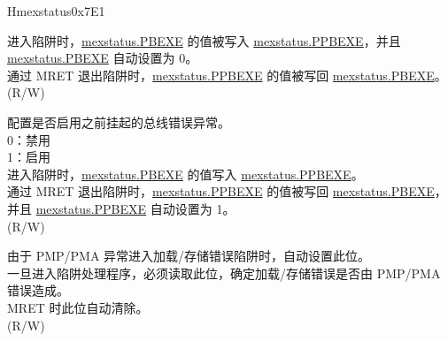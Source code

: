 \begin{register}{H}{mexstatus}{0x7E1}
\begin{regdesc}
\begin{reglist}
进入陷阱时，\hyperref[fielddesc:MEXSTATUS_PBEXE]{mexstatus.PBEXE} 的值被写入 \hyperref[fielddesc:MEXSTATUS_PPBEXE]{mexstatus.PPBEXE}，并且 \hyperref[fielddesc:MEXSTATUS_PBEXE]{mexstatus.PBEXE} 自动设置为 0。\\
通过 MRET 退出陷阱时，\hyperref[fielddesc:MEXSTATUS_PPBEXE]{mexstatus.PPBEXE} 的值被写回 \hyperref[fielddesc:MEXSTATUS_PBEXE]{mexstatus.PBEXE}。\\
(R/W)
\label{fielddesc:MEXSTATUS_PPBEXE}\item [PPBEXE] 配置是否启用之前挂起的总线错误异常。\\
0：禁用\\
1：启用\\
进入陷阱时，\hyperref[fielddesc:MEXSTATUS_PBEXE]{mexstatus.PBEXE} 的值写入 \hyperref[fielddesc:MEXSTATUS_PPBEXE]{mexstatus.PPBEXE}。\\
通过 MRET 退出陷阱时，\hyperref[fielddesc:MEXSTATUS_PPBEXE]{mexstatus.PPBEXE} 的值被写回 \hyperref[fielddesc:MEXSTATUS_PBEXE]{mexstatus.PBEXE}，并且 \hyperref[fielddesc:MEXSTATUS_PPBEXE]{mexstatus.PPBEXE} 自动设置为 1。\\
(R/W)
\label{fielddesc:MEXSTATUS_PMP_ERR}\item [PMP\_ERR] 由于 PMP/PMA 异常进入加载/存储错误陷阱时，自动设置此位。\\
一旦进入陷阱处理程序，必须读取此位，确定加载/存储错误是否由 PMP/PMA 错误造成。\\
MRET 时此位自动清除。\\
(R/W)
\item [见下页……]
\end{reglist}\end{regdesc}
\end{register}
\addtocounter{Regfloat}{-1}
